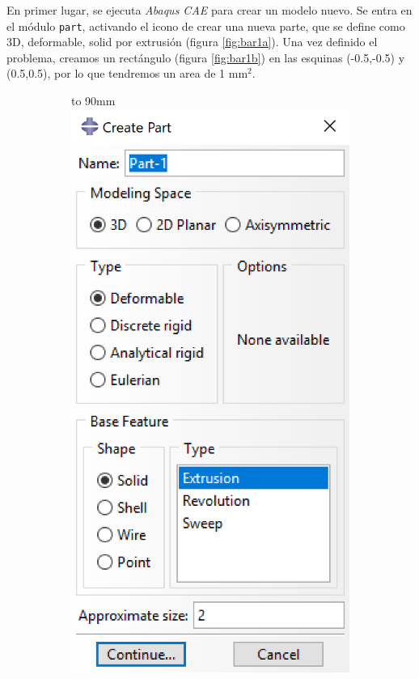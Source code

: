 \documentclass[spanish,a4paper,12pt]{article}
\def\imagebox#1#2{\vtop to #1{\null\hbox{#2}\vfill}}
\begin{document}
En primer lugar, se ejecuta \emph{Abaqus CAE} para crear un modelo nuevo. Se entra en el módulo \texttt{part}, activando el icono de crear una nueva parte, que se define como 3D, deformable, solid por extrusión (figura \ref{fig:bar1a}). Una vez definido el problema, creamos un rectángulo (figura \ref{fig:bar1b}) en las esquinas (-0.5,-0.5) y (0.5,0.5), por lo que tendremos un area de 1 mm$^2$.
\begin{figure}[h!tp]
\centering
\captionsetup[subfigure]{justification=centering,singlelinecheck=false}
  \begin{subfigure}[b]{0.38\textwidth}
  \hspace{10mm}
    \imagebox{90mm}{\includegraphics[scale=0.51]{capturas/solid.png}}

\end{subfigure}
\end{figure}
\end{document}
